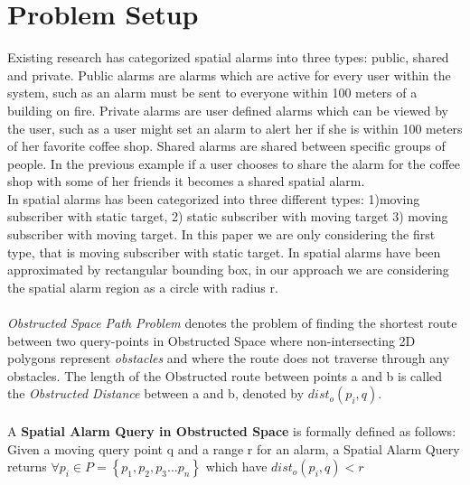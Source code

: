 \section{Problem Setup}
Existing research has categorized spatial alarms into three types: public, shared and private. Public alarms are alarms which are active for every user within the system, such as an alarm must be sent to everyone within 100 meters of a building on fire. Private alarms are user defined alarms which can be viewed by the user, such as a user might set an alarm to alert her if she is within 100 meters of her favorite coffee shop. Shared alarms are shared between specific groups of people. In the previous example if a user chooses to share the alarm for the coffee shop with some of her friends it becomes a shared spatial alarm.\\
In \cite{bamba} spatial alarms has been categorized into three different types: 1)moving subscriber with static target, 2) static subscriber with moving target 3) moving subscriber with moving target. In this paper we are only considering the first type, that is moving subscriber with static target. 
In \cite{mur} spatial alarms have been approximated by rectangular bounding box, in our approach we are considering the spatial alarm region as a circle with radius r.\\ \\
\textit{Obstructed Space Path Problem} \cite{ognn} denotes the problem of finding the shortest route between two query-points  in Obstructed Space where non-intersecting 2D polygons represent \textit{obstacles} and where the route does not traverse through any obstacles. The length of the Obstructed route between points a and b is called the \textit{Obstructed Distance} between a and b, denoted by $dist_o(p_i,q)$.\\ \\
A \textbf{Spatial Alarm Query in Obstructed Space} is formally defined as follows:
Given a moving query point q and a range r for an alarm, a Spatial Alarm Query returns $\forall p_i \in P=\left\lbrace p_1,p_2,p_3...p_n\right\rbrace  $ which have $dist_o(p_i,q)<r $

